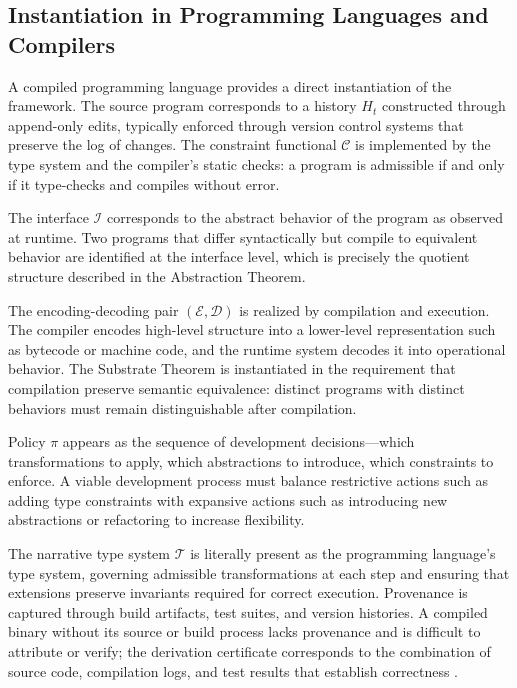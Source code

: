 \documentclass[12pt, a4paper]{article}
\theoremstyle{plain}
\theoremstyle{definition}
\theoremstyle{remark}
\begin{document}
\subsection{Instantiation in Programming Languages and Compilers}

A compiled programming language provides a direct instantiation of the framework. The source program corresponds to a history $H_t$ constructed through append-only edits, typically enforced through version control systems that preserve the log of changes. The constraint functional $\mathcal{C}$ is implemented by the type system and the compiler's static checks: a program is admissible if and only if it type-checks and compiles without error.

The interface $\mathcal{I}$ corresponds to the abstract behavior of the program as observed at runtime. Two programs that differ syntactically but compile to equivalent behavior are identified at the interface level, which is precisely the quotient structure described in the Abstraction Theorem.

The encoding-decoding pair $(\mathcal{E}, \mathcal{D})$ is realized by compilation and execution. The compiler encodes high-level structure into a lower-level representation such as bytecode or machine code, and the runtime system decodes it into operational behavior. The Substrate Theorem is instantiated in the requirement that compilation preserve semantic equivalence: distinct programs with distinct behaviors must remain distinguishable after compilation.

Policy $\pi$ appears as the sequence of development decisions---which transformations to apply, which abstractions to introduce, which constraints to enforce. A viable development process must balance restrictive actions such as adding type constraints with expansive actions such as introducing new abstractions or refactoring to increase flexibility.

The narrative type system $\mathcal{T}$ is literally present as the programming language's type system, governing admissible transformations at each step and ensuring that extensions preserve invariants required for correct execution. Provenance is captured through build artifacts, test suites, and version histories. A compiled binary without its source or build process lacks provenance and is difficult to attribute or verify; the derivation certificate corresponds to the combination of source code, compilation logs, and test results that establish correctness \cite{pierce2002,harper2016}.
\end{document}
